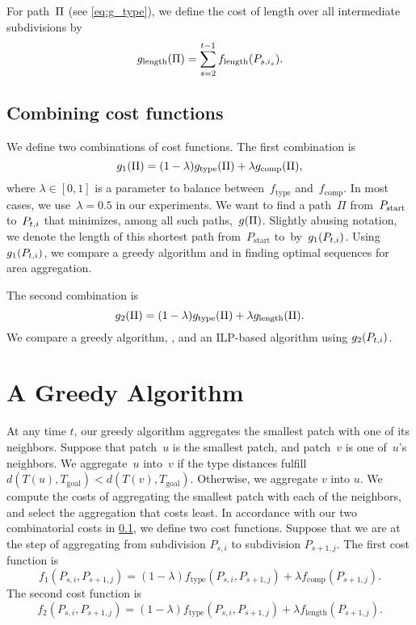 For path~$\Pi$ (see \eq\ref{eq:g_type}), 
we define the cost of length over all 
intermediate subdivisions by
\begin{equation}
\label{eq:g_length}
g_\mathrm{length}(\Pi)=
\sum_{s=2}^{t-1}f_{\mathrm{length}}(P_{s,i_s}).
\end{equation}



\subsection{Combining cost functions}
\label{sec:AreaAgg_Combining}
We define two combinations of cost functions.
The first combination is
\begin{equation}
\label{eq:g_1}
g_1(\Pi)= (1-\lambda)g_\mathrm{type}(\Pi)
+\lambda g_\mathrm{comp}(\Pi),
\end{equation}
where $\lambda \in [0,1]$ is a parameter to balance 
between~$f_\mathrm{type}$ and~$f_\mathrm{comp}$.
In most cases, we use~$\lambda=0.5$ in our experiments. 
We want to find a path~$\Pi$ from~$P_\mathrm{start}$ to~$P_{t,i}$ 
that minimizes, among all such paths,~$g(\Pi)$.
Slightly abusing notation, we denote the length of
this shortest path from~${P}_{\mathrm{start}}$ to~\Pnode by~$g_1(P_{t,i})$.
Using $g_1(P_{t,i})$, we compare a greedy algorithm and \Astar
in finding optimal sequences for area aggregation.

The second combination is 
\begin{equation}
\label{eq:g_2}
g_2(\Pi)= (1-\lambda)g_\mathrm{type}(\Pi)
+\lambda g_\mathrm{length}(\Pi).
\end{equation}
We compare a greedy algorithm, \Astar, and an ILP-based algorithm
using $g_2(P_{t,i})$.



\section{A Greedy Algorithm}
\label{sec:AreaAgg_Greedy}
At any time $t$,
our greedy algorithm aggregates the smallest patch
with one of its neighbors.
Suppose that patch~$u$ is the smallest patch,
and patch~$v$ is one of~$u$'s neighbors.
We aggregate~$u$ into~$v$ 
if the type distances fulfill 
$d(T(u), T_\mathrm{goal})<d(T(v), T_\mathrm{goal})$.
Otherwise, we aggregate $v$ into $u$.
We compute the costs of aggregating the smallest patch 
with each of the neighbors, 
and select the aggregation that costs least.
In accordance 
with our two combinatorial costs in 
\sect\ref{sec:AreaAgg_Combining},
we define two cost functions.
Suppose that we are at the step of 
aggregating from subdivision $P_{s,i}$ to subdivision 
$P_{s+1,j}$.
The first cost function is 
\begin{equation}
\label{eq:f_1}
f_1(P_{s,i},P_{s+1,j})=
(1-\lambda)f_\mathrm{type}(P_{s,i},P_{s+1,j})
+\lambda f_{\mathrm{comp}}(P_{s+1,j}).
\end{equation}
The second cost function is
\begin{equation}
\label{eq:f_2}
f_2(P_{s,i},P_{s+1,j})=
(1-\lambda)f_\mathrm{type}(P_{s,i},P_{s+1,j})
+\lambda f_{\mathrm{length}}(P_{s+1,j}).
\end{equation}



